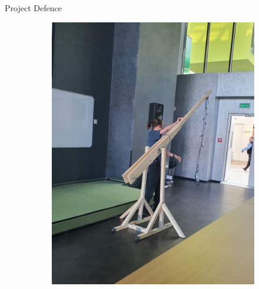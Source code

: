 \documentclass[aspectratio=169]{beamer}
\begin{document}
\begin{frame}[t]{Project Defence}
\begin{figure}[H]
\begin{subfigure}[c]{0.31\textwidth}
            \centering\includegraphics[width=1\textwidth]{resources/fair_2.JPG}
            \label{fig:resources/fair_2.JPG}
        \end{subfigure}
    \end{figure}
\end{frame}
\end{document}
